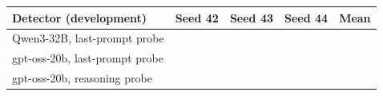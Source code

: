 \begin{tabular}{@{}lcccc@{}}
\toprule
Detector (development) & Seed 42 & Seed 43 & Seed 44 & Mean \\
\midrule
Qwen3-32B, last-prompt probe & \eEighteenQwenDevProbeSeedA{} & \eEighteenQwenDevProbeSeedB{} & \eEighteenQwenDevProbeSeedC{} & \eEighteenQwenDevProbeRound{} \\
gpt-oss-20b, last-prompt probe & \eEighteenGptDevProbeSeedA{} & \eEighteenGptDevProbeSeedB{} & \eEighteenGptDevProbeSeedC{} & \eEighteenGptDevProbeRound{} \\
gpt-oss-20b, reasoning probe & \eEighteenGptDevReasoningSeedA{} & \eEighteenGptDevReasoningSeedB{} & \eEighteenGptDevReasoningSeedC{} & \eEighteenGptDevReasoningRound{} \\
\bottomrule
\end{tabular}
